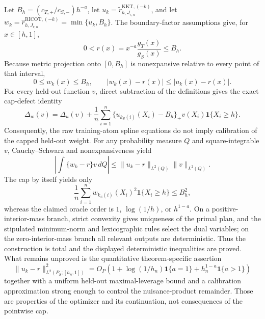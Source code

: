 Let \(B_h=(c_{T,+}/c_{S,-})h^{-a}\), let \(u_k=\widetilde r^{\mathrm{KKT},(-k)}_{h,J_{r,n}}\), and let \(w_k=\widehat r^{\mathrm{RICOT},(-k)}_{h,J_{r,n}}=\min\{u_k,B_h\}\).  The boundary-factor assumptions give, for \(x\in[h,1]\),
\[
0<r(x)=x^{-a}\frac{g_T(x)}{g_S(x)}\le B_h.
\]
Because metric projection onto \([0,B_h]\) is nonexpansive relative to every point of that interval,
\[
0\le w_k(x)\le B_h,
\qquad
|w_k(x)-r(x)|\le |u_k(x)-r(x)|.
\]
For every held-out function \(v\), direct subtraction of the definitions gives the exact cap-defect identity
\[
\Delta_{w}(v)=\Delta_{u}(v)+\frac1n\sum_{i=1}^n\{u_{k_S(i)}(X_i)-B_h\}_+v(X_i)\mathbf 1\{X_i\ge h\}.
\]
Consequently, the raw training-atom spline equations do not imply calibration of the capped held-out weight.  For any probability measure \(Q\) and square-integrable \(v\), Cauchy--Schwarz and nonexpansiveness yield
\[
\left|\int\{w_k-r\}v\,dQ\right|
\le \|u_k-r\|_{L^2(Q)}\|v\|_{L^2(Q)}.
\]
The cap by itself yields only
\[
\frac1n\sum_{i=1}^nw_{k_S(i)}(X_i)^2\mathbf 1\{X_i\ge h\}\le B_h^2,
\]
whereas the claimed oracle order is \(1\), \(\log(1/h)\), or \(h^{1-a}\).  On a positive-interior-mass branch, strict convexity gives uniqueness of the primal plan, and the stipulated minimum-norm and lexicographic rules select the dual variables; on the zero-interior-mass branch all relevant outputs are deterministic.  Thus the construction is total and the displayed deterministic inequalities are proved.  What remains unproved is the quantitative theorem-specific assertion
\[
\|u_k-r\|_{L^2(P_S;[h_n,1])}^2=O_P\!\left(1+\log(1/h_n)\mathbf 1\{a=1\}+h_n^{1-a}\mathbf 1\{a>1\}\right)
\]
together with a uniform held-out maximal-leverage bound and a calibration approximation strong enough to control the nuisance-product remainder.  Those are properties of the optimizer and its continuation, not consequences of the pointwise cap.